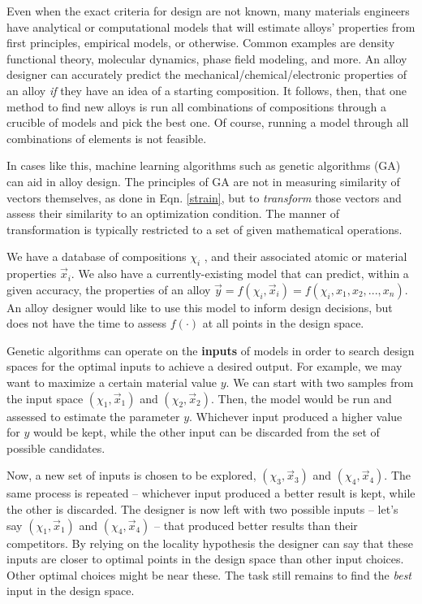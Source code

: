 
Even when the exact criteria for design are not known, many materials engineers have analytical or computational models that will estimate alloys' properties from first principles, empirical models, or otherwise. Common examples are density functional theory, molecular dynamics, phase field modeling, and more. An alloy designer can accurately predict the mechanical/chemical/electronic properties of an alloy \textit{if} they have an idea of a starting composition. It follows, then, that one method to find new alloys is run all combinations of compositions through a crucible of models and pick the best one. Of course, running a model through all combinations of elements is not feasible.

In cases like this, machine learning algorithms such as genetic algorithms (GA) can aid in alloy design. The principles of GA are not in measuring similarity of vectors themselves, as done in Eqn. \ref{strain}, but to \textit{transform} those vectors and assess their similarity to an optimization condition. The manner of transformation is typically restricted to a set of given mathematical operations.

We have a database of compositions $\chi_i$ , and their associated atomic or material properties $\vec{x}_i$. We also have a currently-existing model that can predict, within a given accuracy, the properties of an alloy $\vec{y} = f(\chi_i, \vec{x}_i) = f(\chi_i,x_1,x_2,...,x_n)$. An alloy designer would like to use this model to inform design decisions, but does not have the time to assess $f(\cdot)$ at all points in the design space. 

Genetic algorithms can operate on the \textbf{inputs} of models in order to search design spaces for the optimal inputs to achieve a desired output. For example, we may want to maximize a certain material value $y$. We can start with two samples from the input space $(\chi_1,\vec{x}_1)$ and $(\chi_2, \vec{x}_2)$. Then, the model would be run and assessed to estimate the parameter $y$. Whichever input produced a higher value for $y$ would be kept, while the other input can be discarded from the set of possible candidates.

Now, a new set of inputs is chosen to be explored, $(\chi_3,\vec{x}_3)$ and $(\chi_4,\vec{x}_4)$. The same process is repeated -- whichever input produced a better result is kept, while the other is discarded. The designer is now left with two possible inputs -- let's say $(\chi_1,\vec{x}_1)$ and $(\chi_4,\vec{x}_4)$ -- that produced better results than their competitors. By relying on the locality hypothesis the designer can say that these inputs are closer to optimal points in the design space than other input choices. Other optimal choices might be near these. The task still remains to find the \textit{best} input in the design space.

